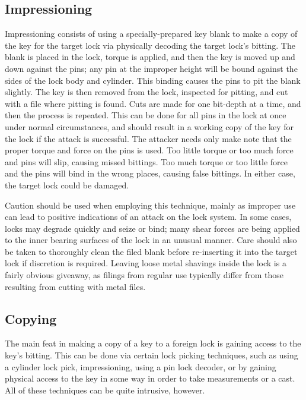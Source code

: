 \documentclass{acm_proc_article-sp}
\begin{document}
\subsection{Impressioning}
Impressioning consists of using a specially-prepared key blank to make a copy of the key for the target lock via physically decoding the target lock's bitting. The blank is placed in the lock, torque is applied, and then the key is moved up and down against the pins; any pin at the improper height will be bound against the sides of the lock body and cylinder. This binding causes the pins to pit the blank slightly. The key is then removed from the lock, inspected for pitting, and cut with a file where pitting is found. Cuts are made for one bit-depth at a time, and then the process is repeated. This can be done for all pins in the lock at once under normal circumstances, and should result in a working copy of the key for the lock if the attack is successful. The attacker needs only make note that the proper torque and force on the pins is used. Too little torque or too much force and pins will slip, causing missed bittings. Too much torque or too little force and the pins will bind in the wrong places, causing false bittings. In either case, the target lock could be damaged.

Caution should be used when employing this technique, mainly as improper use can lead to positive indications of an attack on the lock system. In some cases, locks may degrade quickly and seize or bind; many shear forces are being applied to the inner bearing surfaces of the lock in an unusual manner.  Care should also be taken to thoroughly clean the filed blank before re-inserting it into the target lock if discretion is required. Leaving loose metal shavings inside the lock is a fairly obvious giveaway, as filings from regular use typically differ from those resulting from cutting with metal files.

\subsection{Copying}
The main feat in making a copy of a key to a foreign lock is gaining access to the key's bitting. This can be done via certain lock picking techniques, such as using a cylinder lock pick, impressioning, using a pin lock decoder, or by gaining physical access to the key in some way in order to take measurements or a cast. All of these techniques can be quite intrusive, however.
\end{document}
